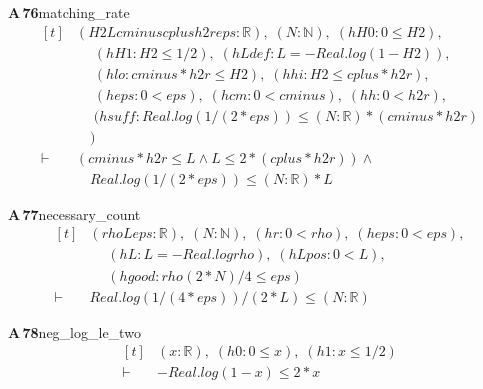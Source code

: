 \documentclass[conference]{IEEEtran}
\theoremstyle{definition}
\newcommand{\lean}[1]{\textsf{\footnotesize #1}}
\begin{document}
\noindent\textbf{A\,76}\quad\lean{matching\_rate}
{\footnotesize\[ \begin{aligned}[t]
&(\mathit{H2} \mathit{L} \mathit{cminus} \mathit{cplus} \mathit{h2r} \mathit{eps} : \mathbb{R} ),\; (\mathit{N} : \mathbb{N} ),\; (\mathit{hH0} : 0 \leq \mathit{H2}),\\
&\quad \; (\mathit{hH1} : \mathit{H2} \leq 1/2),\; (\mathit{hLdef} : \mathit{L} = -\mathit{Real}.\mathit{log} (1 - \mathit{H2})),\\
&\quad \; (\mathit{hlo} : \mathit{cminus} * \mathit{h2r} \leq \mathit{H2}),\; (\mathit{hhi} : \mathit{H2} \leq \mathit{cplus} * \mathit{h2r}),\\
&\quad \; (\mathit{heps} : 0 < \mathit{eps}),\; (\mathit{hcm} : 0 < \mathit{cminus}),\; (\mathit{hh} : 0 < \mathit{h2r}),\\
&\quad \; (\mathit{hsuff} : \mathit{Real}.\mathit{log} (1 / (2 * \mathit{eps})) \leq (\mathit{N} : \mathbb{R} ) * (\mathit{cminus} * \mathit{h2r})\\
&\quad )\\
\vdash\;&(\mathit{cminus} * \mathit{h2r} \leq \mathit{L} \wedge \mathit{L} \leq 2 * (\mathit{cplus} * \mathit{h2r})) \wedge\\
&\quad \mathit{Real}.\mathit{log} (1 / (2 * \mathit{eps})) \leq (\mathit{N} : \mathbb{R} ) * \mathit{L}
\end{aligned} \]}

\noindent\textbf{A\,77}\quad\lean{necessary\_count}
{\footnotesize\[ \begin{aligned}[t]
&(\mathit{rho} \mathit{L} \mathit{eps} : \mathbb{R} ),\; (\mathit{N} : \mathbb{N} ),\; (\mathit{hr} : 0 < \mathit{rho}),\; (\mathit{heps} : 0 < \mathit{eps}),\\
&\quad \; (\mathit{hL} : \mathit{L} = -\mathit{Real}.\mathit{log} \mathit{rho}),\; (\mathit{hLpos} : 0 < \mathit{L}),\\
&\quad \; (\mathit{hgood} : \mathit{rho} ^{} (2 * \mathit{N}) / 4 \leq \mathit{eps})\\
\vdash\;&\mathit{Real}.\mathit{log} (1 / (4 * \mathit{eps})) / (2 * \mathit{L}) \leq (\mathit{N} : \mathbb{R} )
\end{aligned} \]}

\noindent\textbf{A\,78}\quad\lean{neg\_log\_le\_two}
{\footnotesize\[ \begin{aligned}[t]
&(\mathit{x} : \mathbb{R} ),\; (\mathit{h0} : 0 \leq \mathit{x}),\; (\mathit{h1} : \mathit{x} \leq 1/2)\\
\vdash\;&-\mathit{Real}.\mathit{log} (1 - \mathit{x}) \leq 2 * \mathit{x}
\end{aligned} \]}
\end{document}
